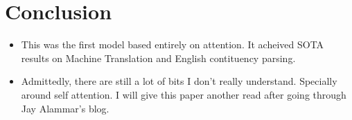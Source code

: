 \documentclass[a4paper]{article}
\begin{document}
\section{Conclusion}
\begin{itemize}
    \item This was the first model based entirely on attention. It acheived SOTA results on Machine Translation and English contituency parsing.
    \item Admittedly, there are still a lot of bits I don't really understand. Specially around self attention. I will give this paper another read after going through Jay Alammar's blog.
\end{itemize}
\end{document}
